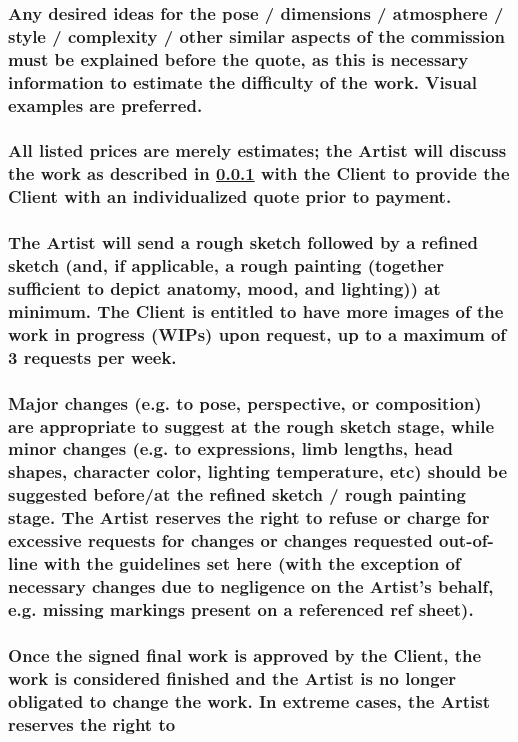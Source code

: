 \documentclass{article}
\begin{document}
\begin{flushleft}
		\subsubsection[Work Description]{\normalfont Any desired ideas for the pose / dimensions / atmosphere / style / complexity / other similar aspects of the commission must be explained before the quote, as this is necessary information to estimate the difficulty of the work. Visual examples are preferred.}\label{workdesc}
		
		\subsubsection[Estimations and Quotes]{\normalfont All listed prices are merely estimates; the Artist will discuss the work as described in \ref{workdesc} with the Client to provide the Client with an individualized quote prior to payment.}

		\subsubsection[WIPs]{\normalfont The Artist will send a rough sketch followed by a refined sketch (and, if applicable, a rough painting (together sufficient to depict anatomy, mood, and lighting)) at minimum. The Client is entitled to have more images of the work in progress (WIPs) upon request, up to a maximum of 3 requests per week.}

		\subsubsection[Changes and Feedback]{\normalfont Major changes (e.g. to pose, perspective, or composition) are appropriate to suggest at the rough sketch stage, while minor changes (e.g. to expressions, limb lengths, head shapes, character color, lighting temperature, etc) should be suggested before/at the refined sketch / rough painting stage. The Artist reserves the right to refuse or charge for excessive requests for changes or changes requested out-of-line with the guidelines set here (with the exception of necessary changes due to negligence on the Artist's behalf, e.g. missing markings present on a referenced ref sheet).}

		\subsubsection[Concluding Work]{\normalfont Once the signed final work is approved by the Client, the work is considered finished and the Artist is no longer obligated to change the work. In extreme cases, the Artist reserves the right to }


\end{flushleft}
\end{document}
